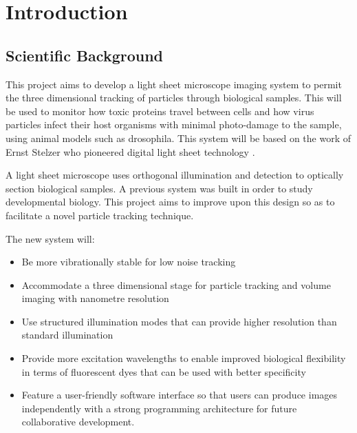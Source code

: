 \ifpdf
    \graphicspath{{Chapter1/Figs/Raster/}{Chapter1/Figs/PDF/}{Chapter1/Figs/}}
\else
    \graphicspath{{Chapter1/Figs/Vector/}{Chapter1/Figs/}}
\fi

\chapter{Introduction}


\section{Scientific Background}
This project aims to develop a light sheet microscope imaging system to permit the three dimensional tracking of particles through biological samples. This will be used to monitor how toxic proteins travel between cells and how virus particles infect their host organisms with minimal %
photo-damage to the sample, using animal models such as drosophila. This system will be based on the work of Ernst Stelzer who pioneered digital light sheet technology \cite{Huisken2004}.

A light sheet microscope uses orthogonal illumination and detection to optically section biological samples.
A previous system was built in order to study developmental biology. This project aims to improve upon this design so as to facilitate a novel particle tracking technique.

The new system will:
\begin{itemize}
	\item Be more vibrationally stable for low noise tracking
	\item Accommodate a three dimensional stage for particle tracking and volume imaging with nanometre resolution
	\item Use structured illumination modes that can provide higher resolution than standard illumination
	\item Provide more excitation wavelengths to enable improved biological flexibility in terms of fluorescent dyes that can be used with better specificity
	\item Feature a user-friendly software interface so that users can produce images independently with a strong programming architecture for future collaborative development.
\end{itemize}

